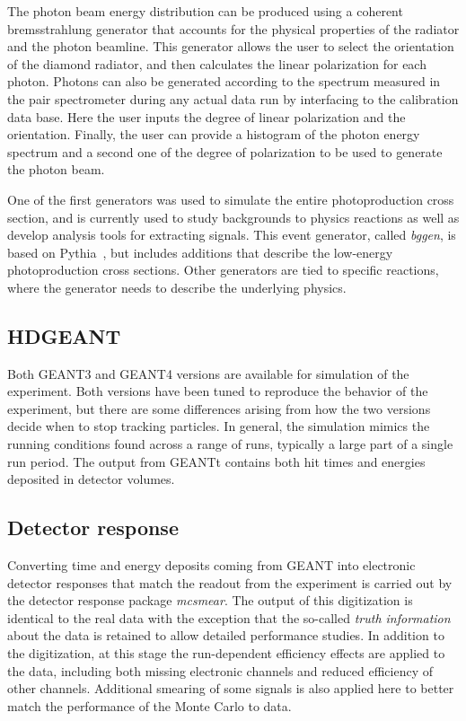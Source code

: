 The photon beam energy distribution can be produced using a coherent bremsstrahlung generator that accounts for the physical properties of the radiator and the photon beamline. This generator allows the user to select the orientation of the diamond radiator, and then calculates the linear polarization for each photon. Photons can also be generated according to the spectrum measured in the pair spectrometer during any actual data run by interfacing to the calibration data base. Here the user inputs the degree of linear polarization and the orientation. Finally, the user can provide a histogram of the photon energy spectrum and a second one of the degree of polarization to be used to generate the photon beam. 

One of the first generators was used to simulate the entire photoproduction cross section, and is currently used to study backgrounds to physics reactions as well as develop analysis tools for extracting signals. This event generator, called {\em bggen}, is based on Pythia~\cite{Sjostrand:2006za}, but includes additions that describe the low-energy photoproduction cross sections. Other generators are tied to specific reactions, where the generator needs to describe the underlying physics.

\subsection{HDGEANT \label{sec:hdgeant}}
Both GEANT3 and GEANT4 versions are available for simulation of the experiment. Both versions have been tuned to reproduce the behavior of the experiment, but there are some differences arising from how the two versions decide when to stop tracking particles. In general, the simulation mimics the running conditions found across a range of runs, typically a large part of a single run period. The output from GEANTt contains both hit times and energies deposited in detector volumes. 

\subsection[Detector response]{Detector response}
Converting time and energy deposits coming from GEANT into electronic detector responses that match the readout from the experiment is carried out by the detector response package \textit{mcsmear}. The output of this digitization is identical to the real data with the exception that the so-called \emph{truth information} about the data is retained to allow detailed performance studies. In addition to the digitization, at this stage the run-dependent efficiency effects are applied to the data, including both missing electronic channels and reduced efficiency of other channels. Additional smearing of some signals is also applied here to better match the performance of the Monte Carlo to data. 

